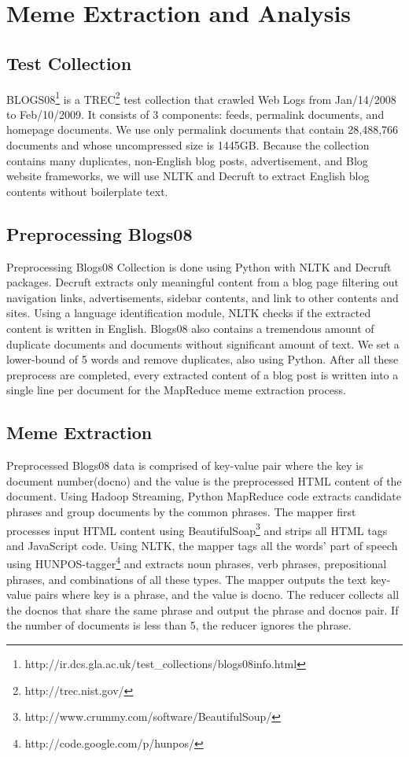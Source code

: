 \documentclass{sig-alternate}
\begin{document}
\section{Meme Extraction and Analysis}

\subsection{Test Collection}

BLOGS08\footnote{http://ir.dcs.gla.ac.uk/test\_collections/blogs08info.html} is a TREC\footnote{http://trec.nist.gov/} test collection that crawled Web Logs from Jan/14/2008 to Feb/10/2009. It consists of 3 components: feeds, permalink documents, and homepage documents. We use only permalink documents that contain 28,488,766 documents and whose uncompressed size is 1445GB. Because the collection contains many duplicates, non-English blog posts, advertisement, and Blog website frameworks, we will use NLTK and Decruft to extract English blog contents without boilerplate text.

\subsection{Preprocessing Blogs08}

Preprocessing Blogs08 Collection is done using Python with NLTK and Decruft packages. Decruft extracts only meaningful content from a blog page filtering out navigation links, advertisements, sidebar contents, and link to other contents and sites. Using a language identification module, NLTK checks if the extracted content is written in English. Blogs08 also contains a tremendous amount of duplicate documents and documents without significant amount of text. We set a lower-bound of 5 words and remove duplicates, also using Python. After all these preprocess are completed, every extracted content of a blog post is written into a single line per document for the MapReduce meme extraction process.

\subsection{Meme Extraction}

Preprocessed Blogs08 data is comprised of key-value pair where the key is document number(docno) and the value is the preprocessed HTML content of the document. Using Hadoop Streaming, Python MapReduce code extracts candidate phrases and group documents by the common phrases. The mapper first processes input HTML content using BeautifulSoap\footnote{http://www.crummy.com/software/BeautifulSoup/} and strips all HTML tags and JavaScript code. Using NLTK, the mapper tags all the words' part of speech using HUNPOS-tagger\footnote{http://code.google.com/p/hunpos/} and extracts noun phrases, verb phrases, prepositional phrases, and combinations of all these types. The mapper outputs the text key-value pairs where key is a phrase, and the value is docno. The reducer collects all the docnos that share the same phrase and output the phrase and docnos pair. If the number of documents is less than 5, the reducer ignores the phrase.
\end{document}
